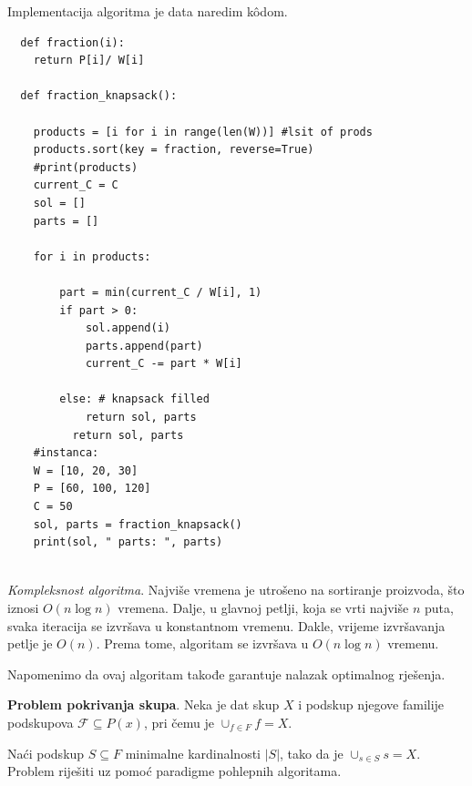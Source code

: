 \begin{solution}
   Implementacija algoritma je data naredim k\^odom. 
   
   \begin{verbatim}
  def fraction(i):
  	return P[i]/ W[i]
  
  def fraction_knapsack():
  
  	products = [i for i in range(len(W))] #lsit of prods
  	products.sort(key = fraction, reverse=True)
  	#print(products)
  	current_C = C
  	sol = []
  	parts = []
  
  	for i in products:
  
  		part = min(current_C / W[i], 1)
  		if part > 0:
  			sol.append(i)
  			parts.append(part)
  			current_C -= part * W[i]
  
  		else: # knapsack filled
  			return sol, parts
          return sol, parts
    #instanca: 
    W = [10, 20, 30]
    P = [60, 100, 120]
    C = 50
    sol, parts = fraction_knapsack()
    print(sol, " parts: ", parts)
  
   \end{verbatim}

\textit{Kompleksnost algoritma}.  Najviše vremena je utrošeno na sortiranje proizvoda, što iznosi $O(n \log n)$ vremena. Dalje, u glavnoj petlji, koja se vrti najviše $n$ puta,  svaka iteracija se izvršava u konstantnom vremenu. Dakle, vrijeme izvršavanja petlje je $O(n)$. Prema tome, algoritam se izvršava u $O(n \log n)$ vremenu.

Napomenimo da ovaj algoritam takođe garantuje nalazak optimalnog rješenja. 
\end{solution}


\begin{example} \textbf{Problem pokrivanja skupa}. Neka je dat skup $X$ i podskup njegove familije podskupova $\mathcal{F} \subseteq P(x)$, pri čemu je
	$\cup_{f \in F} f = X$.
	
	Naći podskup $S \subseteq F$ minimalne kardinalnosti $|S|$, tako da je 
  $\cup_{s \in S} s = X$. Problem riješiti uz pomoć paradigme pohlepnih algoritama. 
	
\end{example}

